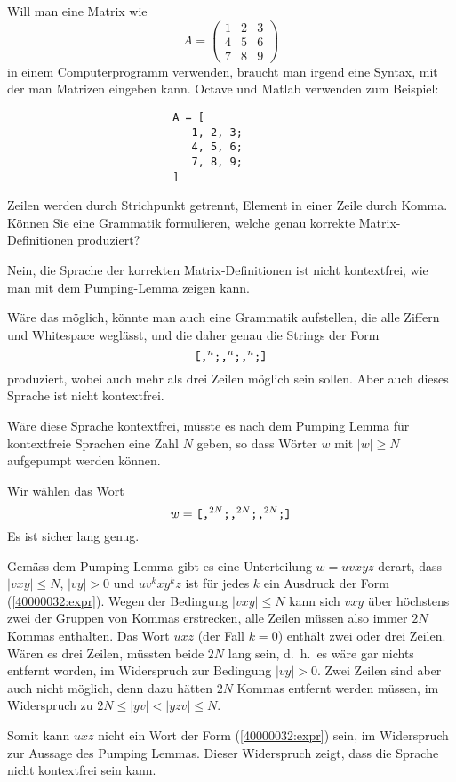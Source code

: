 Will man eine Matrix wie
\[
A=\begin{pmatrix}
1&2&3\\
4&5&6\\
7&8&9
\end{pmatrix}
\]
in einem Computerprogramm verwenden, braucht man irgend eine Syntax,
mit der man Matrizen eingeben kann. Octave und Matlab verwenden zum
Beispiel:
\begin{verbatim}
                          A = [
                             1, 2, 3;
                             4, 5, 6;
                             7, 8, 9;
                          ]
\end{verbatim}
Zeilen werden durch Strichpunkt getrennt, Element in einer Zeile durch Komma.
Können Sie eine Grammatik formulieren, welche genau korrekte
Matrix-Definitionen produziert?


\begin{loesung}
Nein, die Sprache der korrekten Matrix-Definitionen ist nicht
kontextfrei, wie man mit dem Pumping-Lemma zeigen kann.

Wäre das möglich, könnte man auch eine Grammatik aufstellen, die
alle Ziffern und Whitespace weglässt, und die daher genau die Strings der Form 
\begin{equation}
\text{\tt [}
\text{\tt ,}^n
\text{\tt ;}
\text{\tt ,}^n
\text{\tt ;}
\text{\tt ,}^n
\text{\tt ;}
\text{\tt ]}
\label{40000032:expr}
\end{equation}
produziert, wobei auch mehr als drei Zeilen möglich
sein sollen. Aber auch dieses Sprache ist nicht kontextfrei. 

Wäre diese Sprache kontextfrei, müsste es nach dem Pumping Lemma
für kontextfreie Sprachen eine Zahl $N$ geben, so dass Wörter $w$
mit $|w|\ge N$ aufgepumpt werden können. 

Wir wählen das Wort
\[
w=
\text{\tt [}
\text{\tt ,}^{2N}
\text{\tt ;}
\text{\tt ,}^{2N}
\text{\tt ;}
\text{\tt ,}^{2N}
\text{\tt ;}
\text{\tt ]}
\]
Es ist sicher lang genug.

Gemäss dem Pumping Lemma gibt es eine Unterteilung $w=uvxyz$ derart,
dass $|vxy|\le N$, $|vy|>0$ und $uv^kxy^kz$ ist für jedes $k$
ein Ausdruck der Form
(\ref{40000032:expr}).
Wegen der Bedingung $|vxy|\le N$ kann sich $vxy$ über höchstens zwei
der Gruppen von Kommas erstrecken, alle Zeilen müssen
also immer $2N$ Kommas enthalten.
Das Wort $uxz$ (der Fall $k=0$) enthält zwei oder drei Zeilen.
Wären es drei Zeilen, müssten beide $2N$ lang sein, d.~h.~es
wäre gar nichts entfernt worden, im Widerspruch zur Bedingung
$|vy|>0$.
Zwei Zeilen sind aber auch nicht möglich, denn dazu
hätten $2N$ Kommas entfernt werden müssen, im Widerspruch
zu $2N\le |yv|<|yzv|\le N$.

Somit kann $uxz$ nicht ein Wort der Form
(\ref{40000032:expr})
sein, im Widerspruch zur Aussage des Pumping Lemmas.
Dieser Widerspruch zeigt, dass die Sprache nicht kontextfrei
sein kann.
\end{loesung}

